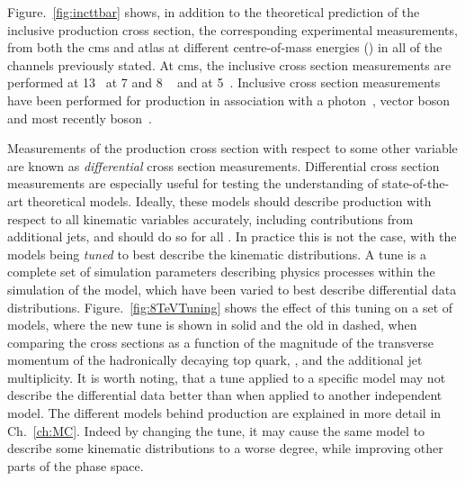 Figure.~\ref{fig:incttbar} shows, in addition to the theoretical prediction of the inclusive \ttbar{} production cross section, the corresponding experimental measurements, from both the \acrshort{cms} and \acrfull{atlas} at different centre-of-mass energies (\sqrts{}) in all of the channels previously stated.
At \acrshort{cms}, the inclusive \ttbar{} cross section measurements are performed at 13\TeV{}~\cite{TOP16005, TOP16006} at 7 and 8 \TeV{}~\cite{TOP10001, TOP10002, TOP10003, TOP11002, TOP11003, TOP11004, TOP11005, TOP12007, TOP12026, TOP12041, TOP13004, TOP14018} and at 5\TeV{}~\cite{TOP16023}.
Inclusive cross section measurements have been performed for \ttbar{} production in association with a photon~\cite{TOP14008}, vector boson~\cite{TOP17005} and most recently \Hboson{} boson~\cite{HIG17035}.

Measurements of the \ttbar{} production cross section with respect to some other variable are known as \textit{differential} cross section measurements.
Differential cross section measurements are especially useful for testing the understanding of state-of-the-art theoretical models.
Ideally, these models should describe \ttbar{} production with respect to all kinematic variables accurately, including contributions from additional jets, and should do so for all \sqrts{}.
In practice this is not the case, with the \ttbar{} models being \textit{tuned} to best describe the kinematic distributions.
A tune is a complete set of simulation parameters describing physics processes within the simulation of the model, which have been varied to best describe differential data distributions.
Figure.~\ref{fig:8TeVTuning} shows the effect of this tuning on a set of \ttbar{} models, where the new tune is shown in solid and the old in dashed, when comparing the cross sections as a function of the magnitude of the transverse momentum of the hadronically decaying top quark, \ptToph{}, and the additional jet multiplicity.
It is worth noting, that a tune applied to a specific model may not describe the differential data better than when applied to another independent model.
The different models behind \ttbar{} production are explained in more detail in Ch.~\ref{ch:MC}.
Indeed by changing the tune, it may cause the same model to describe some kinematic distributions to a worse degree, while improving other parts of the phase space.
